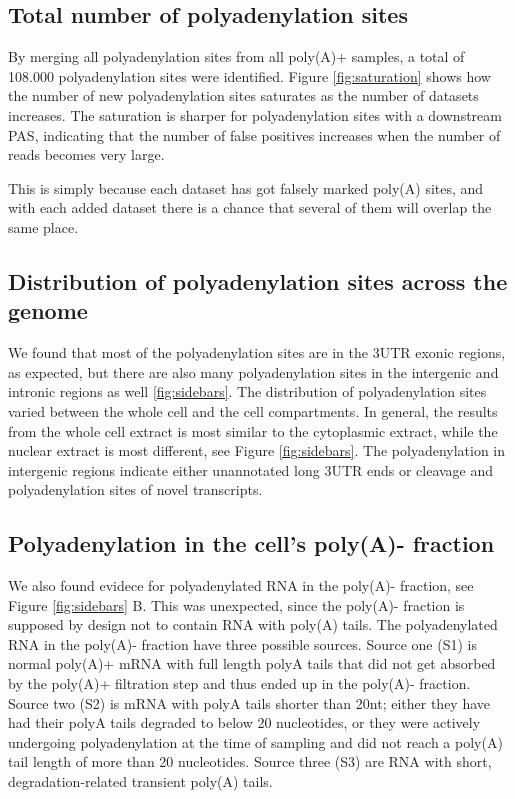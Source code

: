 \subsection{Total number of polyadenylation sites}
By merging all polyadenylation sites from all poly(A)+ samples, a total of
108.000 polyadenylation sites were identified. Figure \ref{fig:saturation}
shows how the number of new polyadenylation sites saturates as the number of
datasets increases. The saturation is sharper for polyadenylation sites with a
downstream PAS, indicating that the number of false positives increases when
the number of reads becomes very large.

This is simply because each dataset has got falsely marked poly(A) sites, and
with each added dataset there is a chance that several of them will overlap the
same place.

\subsection{Distribution of polyadenylation sites across the genome}
We found that most of the polyadenylation sites are in the 3\p UTR exonic
regions, as expected, but there are also many polyadenylation sites in the
intergenic and intronic regions as well \ref{fig:sidebars}. The distribution of
polyadenylation sites varied between the whole cell and the cell compartments.
In general, the results from the whole cell extract is most similar to the
cytoplasmic extract, while the nuclear extract is most different, 
see Figure \ref{fig:sidebars}. The polyadenylation in intergenic regions
indicate either unannotated long 3\p UTR ends or cleavage and polyadenylation
sites of novel transcripts.

\subsection{Polyadenylation in the cell's poly(A)- fraction}
We also found evidece for polyadenylated RNA in the poly(A)- fraction, see
Figure \ref{fig:sidebars} B. This was unexpected, since the poly(A)- fraction
is supposed by design not to contain RNA with poly(A) tails. The polyadenylated
RNA in the poly(A)- fraction have three possible sources. Source one (S1) is
normal poly(A)+ mRNA with full length polyA tails that did not get absorbed by
the poly(A)+ filtration step and thus ended up in the poly(A)- fraction. Source
two (S2) is mRNA with polyA tails shorter than 20nt; either they have had
their polyA tails degraded to below 20 nucleotides, or they were actively
undergoing polyadenylation at the time of sampling and did not reach a poly(A)
tail length of more than 20 nucleotides. Source three (S3) are RNA with short,
degradation-related transient poly(A) tails. 

